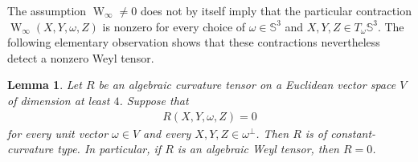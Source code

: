 \documentclass[10pt,a4paper]{amsart}
\newcommand{\Sph}{\mathbb{S}}
\newcommand{\Weyl}{\operatorname{W}}
\newtheorem{lemma}[theorem]{Lemma}
\begin{document}
	The assumption $\Weyl_\infty\neq0$ does not by itself imply that the
	particular contraction
	$\Weyl_\infty(X,Y,\omega,Z)$ is nonzero for every choice of
	$\omega\in\Sph^3$ and $X,Y,Z\in T_\omega\Sph^3$. The following elementary observation shows that these contractions nevertheless detect a nonzero Weyl tensor.
	
	\begin{lemma}\label{lem:BY-radial-Weyl-detection}
		Let $R$ be an algebraic curvature tensor on a Euclidean vector space
		$V$ of dimension at least $4$. Suppose that
		\begin{align*}
			R(X,Y,\omega,Z)=0
		\end{align*}
		for every unit vector $\omega\in V$ and every
		$X,Y,Z\in\omega^\perp$. Then $R$ is of constant-curvature type. In
		particular, if $R$ is an algebraic Weyl tensor, then $R=0$.
	\end{lemma}
	
\end{document}
